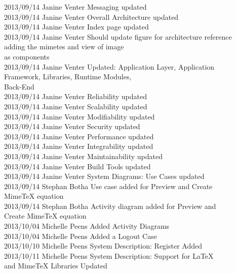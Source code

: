 \documentclass[29pt,a4paper]{moderncv}
\begin{document}
\begin{tabbing}
2013/09/14  \> Janine Venter \> Messaging updated\\
2013/09/14  \> Janine Venter \> Overall Architecture updated\\
2013/09/14  \> Janine Venter \> Index page updated\\
2013/09/14  \> Janine Venter \> Should update figure for architecture reference \\ \> \> \> adding the mimetes and view of image \\ \> \> \> as components\\
2013/09/14  \> Janine Venter \> Updated: Application Layer, Application \\ \> \> \> Framework, Libraries, Runtime Modules, \\ \> \> \> Back-End\\
2013/09/14  \> Janine Venter \> Reliability updated\\
2013/09/14  \> Janine Venter \> Scalability updated\\
2013/09/14  \> Janine Venter \>Modifiability updated\\
2013/09/14  \> Janine Venter \> Security updated\\
2013/09/14  \> Janine Venter \> Performance updated\\
2013/09/14  \> Janine Venter \> Integrability updated\\
2013/09/14  \> Janine Venter \> Maintainability updated\\
2013/09/14  \> Janine Venter \> Build Tools updated\\
2013/09/14  \> Janine Venter \>System Diagrams: Use Cases updated\\
2013/09/14  \> Stephan Botha \> Use case added for  Preview and Create \\ \> \> \> MimeTeX equation\\
2013/09/14  \> Stephan Botha \> Activity diagram added for Preview and \\ \> \> \> Create MimeTeX equation\\
2013/10/04  \> Michelle Peens \> Added Activity Diagrams\\
2013/10/04  \> Michelle Peens \> Added a Logout Case\\
2013/10/10  \> Michelle Peens \> System Description: Register Added\\
2013/10/11  \> Michelle Peens \> System Description: Support for LaTeX \\ \> \> \> and MimeTeX Libraries Updated\\

\end{tabbing}
\end{document}
